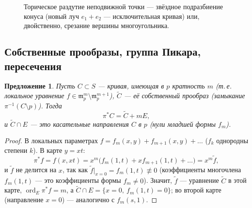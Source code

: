 \documentclass[11pt,a4paper]{article}
\theoremstyle{plain}
\newtheorem{proposition}[theorem]{Предложение}
\theoremstyle{definition}
\theoremstyle{remark}
\newcommand{\PP}{\mathbb{P}}
\newcommand{\mm}{\mathfrak{m}}
\DeclareMathOperator{\ord}{ord}
\DeclareMathOperator{\Bl}{Bl}
\begin{document}
\begin{figure}[ht]
\centering
{}
\quad\raisebox{1.3cm}{$\xleftarrow{\ \ \pi\ \ }$}\quad
{}
\qquad\qquad
{}
\caption{Торическое раздутие неподвижной точки --- звёздное подразбиение конуса (новый луч $e_1+e_2$
--- исключительная кривая) или, двойственно, срезание вершины многоугольника.}
\label{fig:star}
\end{figure}

\subsection{Собственные прообразы, группа Пикара, пересечения}

\begin{proposition}\label{prop:strict}
Пусть $C\subset S$ --- кривая, имеющая в $p$ кратность $m$ (т.\,е. локальное уравнение $f\in\mm_p^m\setminus
\mm_p^{m+1}$), $\tilde C$ --- её \emph{собственный прообраз} (замыкание $\pi^{-1}(C\setminus p)$). Тогда
\[
\pi^*C=\tilde C+mE,
\]
и $\tilde C\cap E$ --- это касательные направления $C$ в $p$ (нули младшей формы $f_m$).
\end{proposition}
\begin{proof}
В локальных параметрах $f=f_m(x,y)+f_{m+1}(x,y)+\dots$ ($f_k$ однородны степени $k$). В карте $y=xt$:
\[
\pi^*f=f(x,xt)=x^m\big(f_m(1,t)+xf_{m+1}(1,t)+\dots\big)=x^m\tilde f,
\]
и $\tilde f$ не делится на $x$, так как $\tilde f|_{x=0}=f_m(1,t)\not\equiv0$ (коэффициенты многочлена
$f_m(1,t)$ --- это коэффициенты формы $f_m\ne0$). Значит, $\tilde f$ --- уравнение $\tilde C$ в этой карте,
$\ord_E\pi^*f=m$, а $\tilde C\cap E=\{x=0,\ f_m(1,t)=0\}$; во второй карте (направление $x=0$) ---
аналогично с $f_m(s,1)$.
\end{proof}
\end{document}
